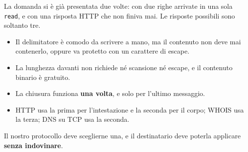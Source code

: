 La domanda si è già presentata due volte: con due righe arrivate in una sola \texttt{read}, e con una risposta HTTP che
non finiva mai. Le risposte possibili sono soltanto tre.


\begin{itemize}
    \item Il delimitatore è comodo da scrivere a mano, ma il contenuto non deve mai contenerlo, oppure va protetto con un
          carattere di escape.
    \item La lunghezza davanti non richiede né scansione né escape, e il contenuto binario è gratuito.
    \item La chiusura funziona \textbf{una volta}, e solo per l'ultimo messaggio.
    \item HTTP usa la prima per l'intestazione e la seconda per il corpo; WHOIS usa la terza; DNS su TCP usa la seconda.
\end{itemize}
Il nostro protocollo deve sceglierne una, e il destinatario deve poterla applicare \textbf{senza indovinare}.

